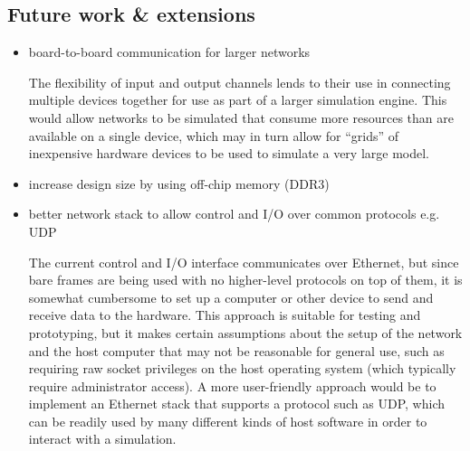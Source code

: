 \documentclass[english]{article}
\begin{document}
\subsection{Future work \& extensions}

\begin{itemize}
\item board-to-board communication for larger networks

The flexibility of input and output channels lends to their use in connecting multiple devices together for use as part of a larger simulation engine.
This would allow networks to be simulated that consume more resources than are available on a single device, which may in turn allow
for ``grids'' of inexpensive hardware devices to be used to simulate a very large model.
\item increase design size by using off-chip memory (DDR3)
\item better network stack to allow control and I/O over common protocols e.g. UDP

The current control and I/O interface communicates over Ethernet, but since bare frames are being used with no higher-level protocols on top of them,
it is somewhat cumbersome to set up a computer or other device to send and receive data to the hardware.
This approach is suitable for testing and prototyping, but it makes certain assumptions about the setup of the network and the host computer that
may not be reasonable for general use, such as requiring raw socket privileges on the host operating system (which typically require administrator access).
A more user-friendly approach would be to implement an Ethernet stack that supports a protocol such as UDP, which can be readily used by many different
kinds of host software in order to interact with a simulation.
\end{itemize}
\end{document}
